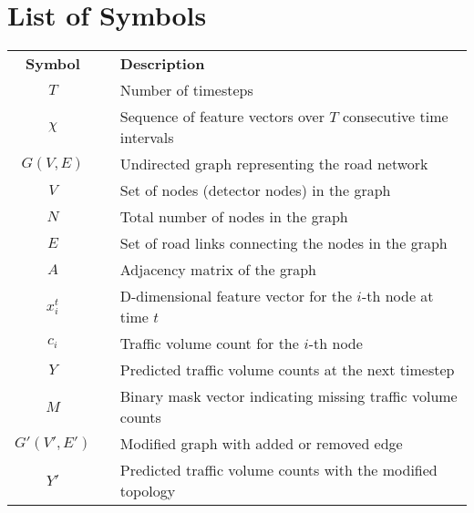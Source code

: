 \newpage
\chapter*{List of Symbols}
\begin{center}\centering
\begin{longtable}{cp{2cm}l}
\textbf{Symbol} & & \textbf{Description} \\
$T$ & & Number of timesteps \\
$\chi$ & & Sequence of feature vectors over $T$ consecutive time intervals \\
$G(V, E)$ & & Undirected graph representing the road network \\
$V$ & & Set of nodes (detector nodes) in the graph \\
$N$ & & Total number of nodes in the graph \\
$E$ & & Set of road links connecting the nodes in the graph \\
$A$ & & Adjacency matrix of the graph \\
$x^t_i$ & & D-dimensional feature vector for the $i$-th node at time $t$ \\
$c_i$ & & Traffic volume count for the $i$-th node \\
$Y$ & & Predicted traffic volume counts at the next timestep \\
$M$ & & Binary mask vector indicating missing traffic volume counts \\
$G'(V', E')$ & & Modified graph with added or removed edge \\
$Y'$ & & Predicted traffic volume counts with the modified topology \\
\end{longtable}
\end{center}

